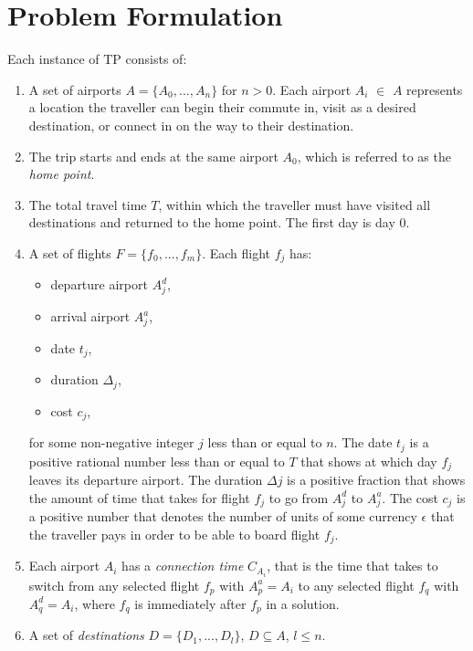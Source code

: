 \documentclass{mprop}
\theoremstyle{definition}
\begin{document}
\section{Problem Formulation}
\label{sec:tpformulation}

Each instance of TP consists of:

\begin{enumerate}
\item A set of airports $A = \{ A_{0},...,A_{n} \}$ for $n > 0$. Each airport $A_{i}$ $\in$ $A$ represents a location the traveller can begin their commute in, visit as a desired destination, or connect in on the way to their destination.

\item The trip starts and ends at the same airport $A_{0}$, which is referred to as the \textit{home point}.

\item The total travel time $T$, within which the traveller must have visited all destinations and returned to the home point. The first day is day 0.
 
\item A set of flights $F = \{ f_{0},...,f_{m} \}$. Each flight $f_{j}$ has:
\begin{itemize}
\item departure airport $A^{d}_{j}$,
\item arrival airport $A^{a}_{j}$,
\item date $t_{j}$,
\item duration $\Delta_{j}$,
\item cost $c_{j}$,
\end{itemize} 
for some non-negative integer $j$ less than or equal to $n$.
The date $t_{j}$ is a positive rational number less than or equal to $T$ that shows at which day $f_{j}$ leaves its departure airport. The duration $\Delta{j}$ is a positive fraction that shows the amount of time that takes for flight $f_{j}$ to go from $A^{d}_{j}$ to $A^{a}_{j}$. The cost $c_{j}$ is a positive number that denotes the number of units of some currency $\epsilon$ that the traveller pays in order to be able to board flight $f_{j}$.

\item Each airport $A_{i}$ has a \textit{connection time} $C_{A_{i}}$, that is the time that takes to switch from any selected flight $f_{p}$ with $A^{a}_{p} = A_{i}$ to any selected flight $f_{q}$ with $A^{d}_{q} = A_{i}$, where $f_{q}$ is immediately after $f_{p}$ in a solution.

\item A set of \textit{destinations} $D = \{ D_{1},...,D_{l} \}$, $D \subseteq A$, $l \leq n$.
\end{enumerate}
\end{document}
